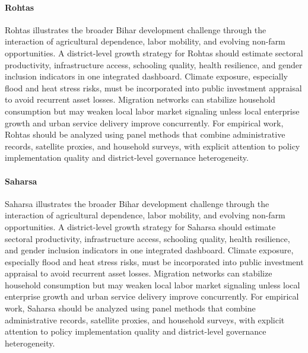 \documentclass[preprint,12pt]{elsarticle}
\begin{document}
\paragraph{Rohtas} Rohtas illustrates the broader Bihar development challenge through the interaction of agricultural dependence, labor mobility, and evolving non-farm opportunities. A district-level growth strategy for Rohtas should estimate sectoral productivity, infrastructure access, schooling quality, health resilience, and gender inclusion indicators in one integrated dashboard. Climate exposure, especially flood and heat stress risks, must be incorporated into public investment appraisal to avoid recurrent asset losses. Migration networks can stabilize household consumption but may weaken local labor market signaling unless local enterprise growth and urban service delivery improve concurrently. For empirical work, Rohtas should be analyzed using panel methods that combine administrative records, satellite proxies, and household surveys, with explicit attention to policy implementation quality and district-level governance heterogeneity.

\paragraph{Saharsa} Saharsa illustrates the broader Bihar development challenge through the interaction of agricultural dependence, labor mobility, and evolving non-farm opportunities. A district-level growth strategy for Saharsa should estimate sectoral productivity, infrastructure access, schooling quality, health resilience, and gender inclusion indicators in one integrated dashboard. Climate exposure, especially flood and heat stress risks, must be incorporated into public investment appraisal to avoid recurrent asset losses. Migration networks can stabilize household consumption but may weaken local labor market signaling unless local enterprise growth and urban service delivery improve concurrently. For empirical work, Saharsa should be analyzed using panel methods that combine administrative records, satellite proxies, and household surveys, with explicit attention to policy implementation quality and district-level governance heterogeneity.
\end{document}
